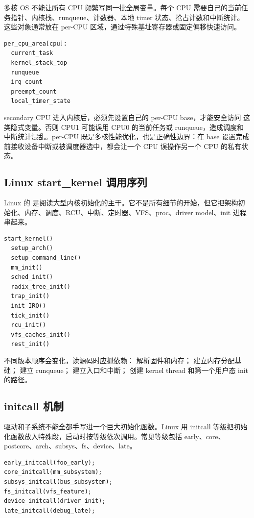 多核 OS 不能让所有 CPU 频繁写同一批全局变量。每个 CPU 需要自己的当前任务指针、内核栈、runqueue、计数器、本地 timer 状态、抢占计数和中断统计。这些对象通常放在 per-CPU 区域，通过特殊基址寄存器或固定偏移快速访问。

\begin{lstlisting}
per_cpu_area[cpu]:
  current_task
  kernel_stack_top
  runqueue
  irq_count
  preempt_count
  local_timer_state
\end{lstlisting}

\begin{warningbox}
secondary CPU 进入内核后，必须先设置自己的 per-CPU base，才能安全访问  这类隐式变量。否则 CPU1 可能误用 CPU0 的当前任务或 runqueue，造成调度和中断统计混乱。per-CPU 既是多核性能优化，也是正确性边界：在 base 设置完成前接收设备中断或被调度器选中，都会让一个 CPU 误操作另一个 CPU 的私有状态。
\end{warningbox}

\subsection{Linux start\_kernel 调用序列}

Linux 的  是阅读大型内核初始化的主干。它不是所有细节的开始，但它把架构初始化、内存、调度、RCU、中断、定时器、VFS、proc、driver model、init 进程串起来。

\begin{lstlisting}
start_kernel()
  setup_arch()
  setup_command_line()
  mm_init()
  sched_init()
  radix_tree_init()
  trap_init()
  init_IRQ()
  tick_init()
  rcu_init()
  vfs_caches_init()
  rest_init()
\end{lstlisting}

不同版本顺序会变化，读源码时应抓依赖： 解析固件和内存； 建立内存分配基础； 建立 runqueue； 建立入口和中断； 创建 kernel thread 和第一个用户态 init 的路径。

\subsection{initcall 机制}

驱动和子系统不能全都手写进一个巨大初始化函数。Linux 用 initcall 等级把初始化函数放入特殊段，启动时按等级依次调用。常见等级包括 early、core、postcore、arch、subsys、fs、device、late。

\begin{lstlisting}
early_initcall(foo_early);
core_initcall(mm_subsystem);
subsys_initcall(bus_subsystem);
fs_initcall(vfs_feature);
device_initcall(driver_init);
late_initcall(debug_late);
\end{lstlisting}

